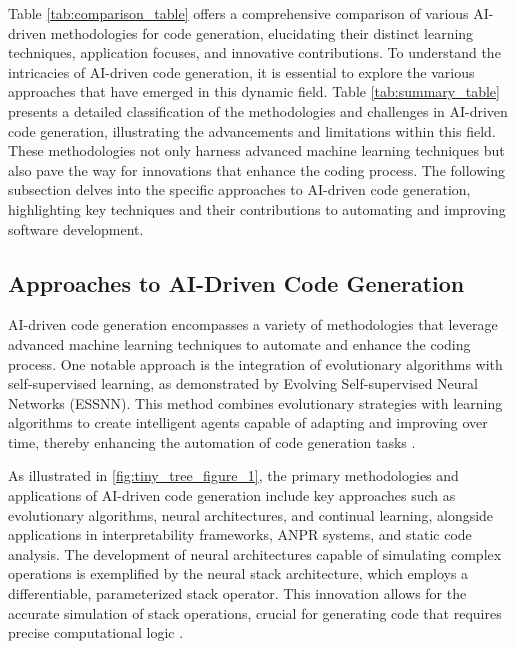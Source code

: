 



Table \ref{tab:comparison_table} offers a comprehensive comparison of various AI-driven methodologies for code generation, elucidating their distinct learning techniques, application focuses, and innovative contributions. To understand the intricacies of AI-driven code generation, it is essential to explore the various approaches that have emerged in this dynamic field. Table \ref{tab:summary_table} presents a detailed classification of the methodologies and challenges in AI-driven code generation, illustrating the advancements and limitations within this field. These methodologies not only harness advanced machine learning techniques but also pave the way for innovations that enhance the coding process. The following subsection delves into the specific approaches to AI-driven code generation, highlighting key techniques and their contributions to automating and improving software development.

 








\subsection{Approaches to AI-Driven Code Generation} \label{subsec:Approaches to AI-Driven Code Generation}

AI-driven code generation encompasses a variety of methodologies that leverage advanced machine learning techniques to automate and enhance the coding process. One notable approach is the integration of evolutionary algorithms with self-supervised learning, as demonstrated by Evolving Self-supervised Neural Networks (ESSNN). This method combines evolutionary strategies with learning algorithms to create intelligent agents capable of adapting and improving over time, thereby enhancing the automation of code generation tasks \cite{le2019evolvingselfsupervisedneuralnetworks}.

As illustrated in \autoref{fig:tiny_tree_figure_1}, the primary methodologies and applications of AI-driven code generation include key approaches such as evolutionary algorithms, neural architectures, and continual learning, alongside applications in interpretability frameworks, ANPR systems, and static code analysis. The development of neural architectures capable of simulating complex operations is exemplified by the neural stack architecture, which employs a differentiable, parameterized stack operator. This innovation allows for the accurate simulation of stack operations, crucial for generating code that requires precise computational logic \cite{stogin2022provablystableneuralnetwork}.

